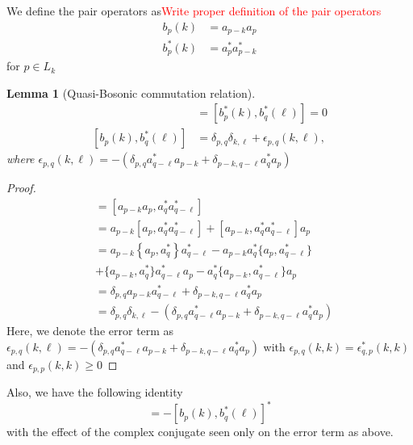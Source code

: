 \documentclass[sn-mathphys,Numbered, a4paper ,nocrop]{sn-jnl}%
\theoremstyle{plain}
\newtheorem{lemma}[theorem]{Lemma}
\theoremstyle{definition}
\theoremstyle{remark}
\theoremstyle{plain}
\theoremstyle{definition}
\theoremstyle{remark}
\begin{document}
We define the pair operators as\textcolor{red}{Write proper definition of the pair operators}
\begin{align}
    b_p(k) &= a_{p-k}a_{p}\\
    b^*_p(k) &= a^*_{p}a^*_{p-k}
\end{align}
for $p\in L_k$
\begin{lemma}[Quasi-Bosonic commutation relation]
   \begin{align}
       [b_{p}(k),b_{q}(\ell)] &= [b^*_{p}(k),b^*_{q}(\ell)] = 0\\
       [b_{p}(k),b^*_{q}(\ell)] &= \delta_{p,q}\delta_{k,\ell} + \epsilon_{p,q}(k,\ell),
   \end{align} where $\epsilon_{p,q}(k,\ell) = -\left(\delta_{p,q}a^*_{q-\ell}a_{p-k} + \delta_{p-k,q-\ell}a^*_{q}a_{p}\right)$ 
    \end{lemma}
\begin{proof}
    \begin{align}
        [b_{p}(k),b^*_{q}(\ell)] &= [a_{p-k}a_{p},a^*_{q}a^*_{q-\ell}]\nonumber\\
        &= a_{p-k}[a_p,a^*_{q}a^*_{q-\ell}] + [a_{p-k},a^*_{q}a^*_{q-\ell}]a_{p}\nonumber\\
        &= a_{p-k}\left\{a_p,a^*_{q}\right\}a^*_{q-\ell} - a_{p-k}a^*_{q}\{a_{p},a^*_{q-\ell}\}\nonumber \\ &+ \{a_{p-k},a^*_q\}a^*_{q-\ell}a_{p} - a^*_{q}\{a_{p-k},a^*_{q-\ell}\}a_{p}\nonumber\\
        &=\delta_{p,q}a_{p-k}a^*_{q-\ell} + \delta_{p-k,q-\ell}a^*_{q}a_{p}\nonumber\\
        &= \delta_{p,q}\delta_{k,\ell}-\left(\delta_{p,q}a^*_{q-\ell}a_{p-k} + \delta_{p-k,q-\ell}a^*_{q}a_{p}\right)
    \end{align}
Here, we denote the error term as $\epsilon_{p,q}(k,\ell) = -\left(\delta_{p,q}a^*_{q-\ell}a_{p-k} + \delta_{p-k,q-\ell}a^*_{q}a_{p}\right)$ with $\epsilon_{p,q}(k,k) = \epsilon^*_{q,p}(k,k) $ and $\epsilon_{p,p}(k,k)\geq 0$
\end{proof}
Also, we have the following identity
\begin{equation}
    [b^*_p(k), b_q(\ell)] = -[b_{p}(k),b^*_{q}(\ell)]^*
\end{equation}
with the effect of the complex conjugate seen only on the error term as above.  
\end{document}

